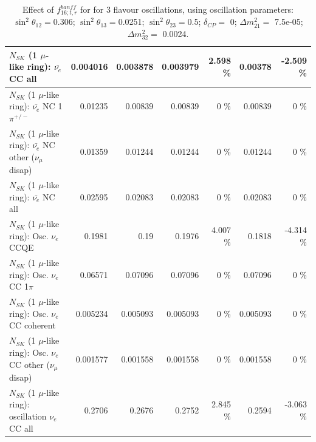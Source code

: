 \begin{table}
\begin{tabular}{| l | r | r | r  r | r  r |}
                            $N_{SK}$ (1 $\mu$-like ring): $\bar{\nu_{e}}$ CC all &        0.004016 &        0.003878 &        0.003979 &    2.598 \%  &         0.00378 &   -2.509 \%  \\ 
\hline
                     $N_{SK}$ (1 $\mu$-like ring): $\bar{\nu_e}$ NC 1$\pi^{+/-}$ &         0.01235 &         0.00839 &         0.00839 &        0 \%  &         0.00839 &        0 \%  \\ 
          $N_{SK}$ (1 $\mu$-like ring): $\bar{\nu_e}$ NC other ($\nu_\mu$ disap) &         0.01359 &         0.01244 &         0.01244 &        0 \%  &         0.01244 &        0 \%  \\ 
                            $N_{SK}$ (1 $\mu$-like ring): $\bar{\nu_{e}}$ NC all &         0.02595 &         0.02083 &         0.02083 &        0 \%  &         0.02083 &        0 \%  \\ 
\hline
\hline
\hline
                                 $N_{SK}$ (1 $\mu$-like ring): Osc. $\nu_e$ CCQE &          0.1981 &            0.19 &          0.1976 &    4.007 \%  &          0.1818 &   -4.314 \%  \\ 
                            $N_{SK}$ (1 $\mu$-like ring): Osc. $\nu_e$ CC 1$\pi$ &         0.06571 &         0.07096 &         0.07096 &        0 \%  &         0.07096 &        0 \%  \\ 
                          $N_{SK}$ (1 $\mu$-like ring): Osc. $\nu_e$ CC coherent &        0.005234 &        0.005093 &        0.005093 &        0 \%  &        0.005093 &        0 \%  \\ 
           $N_{SK}$ (1 $\mu$-like ring): Osc. $\nu_e$ CC other ($\nu_\mu$ disap) &        0.001577 &        0.001558 &        0.001558 &        0 \%  &        0.001558 &        0 \%  \\ 
                        $N_{SK}$ (1 $\mu$-like ring): oscillation $\nu_e$ CC all &          0.2706 &          0.2676 &          0.2752 &    2.845 \%  &          0.2594 &   -3.063 \%  \\ 
\hline
\hline
\end{tabular}
\caption{ Effect of $f_{16; t, r}^{banff}$ for for 3 flavour oscillations, using oscillation parameters:  $\sin^2\theta_{12} = $0.306; $\sin^2\theta_{13} = $0.0251; $\sin^2\theta_{23} = $0.5; $\delta_{CP} = $        0; $\Delta m^2_{21} = $    7.5e-05; $\Delta m^2_{32} = $    0.0024. }
\label{tab:num_banff_maqe_1RmuT_3f_osc_t13:0.0251}
\end{table}
\clearpage
